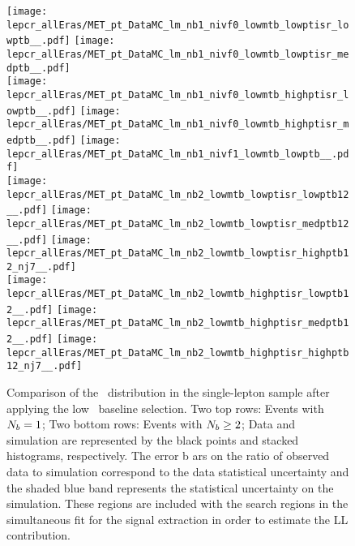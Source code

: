 \begin{figure}[!htb]
	\begin{center}  
		\texttt{[image: lepcr\_allEras/MET\_pt\_DataMC\_lm\_nb1\_nivf0\_lowmtb\_lowptisr\_lowptb\_\_.pdf]}
		\texttt{[image: lepcr\_allEras/MET\_pt\_DataMC\_lm\_nb1\_nivf0\_lowmtb\_lowptisr\_medptb\_\_.pdf]} \\
		\texttt{[image: lepcr\_allEras/MET\_pt\_DataMC\_lm\_nb1\_nivf0\_lowmtb\_highptisr\_lowptb\_\_.pdf]}
		\texttt{[image: lepcr\_allEras/MET\_pt\_DataMC\_lm\_nb1\_nivf0\_lowmtb\_highptisr\_medptb\_\_.pdf]}
		\texttt{[image: lepcr\_allEras/MET\_pt\_DataMC\_lm\_nb1\_nivf1\_lowmtb\_lowptb\_\_.pdf]} \\
		\texttt{[image: lepcr\_allEras/MET\_pt\_DataMC\_lm\_nb2\_lowmtb\_lowptisr\_lowptb12\_\_.pdf]} 
		\texttt{[image: lepcr\_allEras/MET\_pt\_DataMC\_lm\_nb2\_lowmtb\_lowptisr\_medptb12\_\_.pdf]}
		\texttt{[image: lepcr\_allEras/MET\_pt\_DataMC\_lm\_nb2\_lowmtb\_lowptisr\_highptb12\_nj7\_\_.pdf]} \\
		\texttt{[image: lepcr\_allEras/MET\_pt\_DataMC\_lm\_nb2\_lowmtb\_highptisr\_lowptb12\_\_.pdf]} 
		\texttt{[image: lepcr\_allEras/MET\_pt\_DataMC\_lm\_nb2\_lowmtb\_highptisr\_medptb12\_\_.pdf]}
		\texttt{[image: lepcr\_allEras/MET\_pt\_DataMC\_lm\_nb2\_lowmtb\_highptisr\_highptb12\_nj7\_\_.pdf]} \\
	\end{center}
	\caption[Lost Lepton LM Control Region $\nb=1$]{Comparison of the \met~distribution in the single-lepton sample after applying the low \dm~baseline selection. Two top rows: Events with $\nb=1$; Two bottom rows: Events with $N_{b} \geq2$;  Data and simulation are represented by the black points and stacked histograms, respectively. The error b    ars on the ratio of observed data to simulation correspond to the data statistical uncertainty and the shaded blue band represents the statistical uncertainty on the simulation. These regions are included with the search regions in the simultaneous fit for the signal extraction in order to estimate the LL contribution.
	 }
	\label{fig:llb-1lcr-datavsmc-lm-nb1}
\end{figure}
